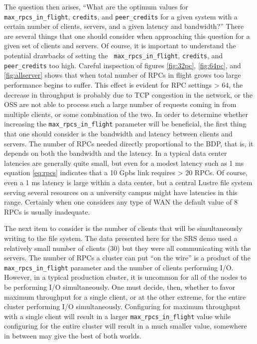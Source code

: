 \documentclass[]{sigplan-proc}
\begin{document}
The question then arises, ``What are the optimum values for {\tt max\_rpcs\_in\_flight}, {\tt credits}, and
{\tt peer\_credits} for a given system with a certain number of clients, servers, and a given latency and
bandwidth?'' There are several things that one should consider when approaching this question for a given set
of clients and servers. Of course, it is important to understand the potential drawbacks of setting the {\tt
  max\_rpcs\_in\_flight}, {\tt credits}, and {\tt peer\_credits} too high. Careful inspection of figures
\ref{fig:32pc}, \ref{fig:64pc}, and \ref{fig:allserver} shows that when total number of RPCs in flight grows
too large performance begins to suffer. This effect is evident for RPC settings > 64, the decrease in
throughput is probably due to TCP congestion in the network, or the OSS are not able to process such a large
number of requests coming in from multiple clients, or some combination of the two. In order to determine
whether increasing the {\tt max\_rpcs\_in\_flight} parameter will be beneficial, the first thing that one
should consider is the bandwidth and latency between clients and servers. The number of RPCs needed directly
proportional to the BDP, that is, it depends on both the bandwidth and the latency. In a typical data center
latencies are generally quite small, but even for a modest latency such as 1 ms equation \ref{eq:rpcs}
indicates that a 10 Gpbs link requires > 20 RPCs. Of course, even a 1 ms latency is large within a data
center, but a central Lustre file system serving several resources on a university campus might have latencies
in this range. Certainly when one considers any type of WAN the default value of 8 RPCs is usually inadequate.

The next item to consider is the number of clients that will be simultaneously writing to the file system. The
data presented here for the SRS demo used a relatively small number of clients (30) but they were all
communicating with the servers. The number of RPCs a cluster can put ``on the wire'' is a product of the {\tt
  max\_rpcs\_in\_flight} parameter and the number of clients performing I/O. However, in a typical production
cluster, it is uncommon for all of the nodes to be performing I/O simultaneously.  One must decide, then,
whether to favor maximum throughput for a single client, or at the other extreme, for the entire cluster
performing I/O simultaneously. Configuring for maximum throughput with a single client will result in a larger
{\tt max\_rpcs\_in\_flight} value while configuring for the entire cluster will result in a much smaller
value, somewhere in between may give the best of both worlds.
\end{document}
